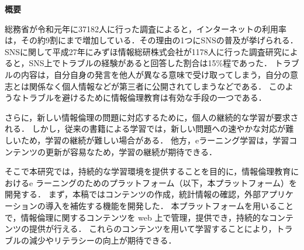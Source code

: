 \begin{center}
{\bf \Large 概要}
\end{center}

総務省が令和元年に37182人に行った調査によると，インターネットの利用率は，その約9割にまで増加している\cite{soumu}．その理由の1つにSNSの普及が挙げられる．
SNSに関して平成27年にみずほ情報総研株式会社が1178人に行った調査研究\cite{mizuho}によると，SNS上でトラブルの経験があると回答した割合は15\%程であった．
トラブルの内容は，自分自身の発言を他人が異なる意味で受け取ってしまう，自分の意志とは関係なく個人情報などが第三者に公開されてしまうなどである．
このようなトラブルを避けるために情報倫理教育は有効な手段の一つである\cite{moraru}．

さらに，新しい情報倫理の問題に対応するために，個人の継続的な学習が要求される\cite{fluency}．
しかし，従来の書籍による学習では，新しい問題への速やかな対応が難しいため，学習の継続が難しい場合がある．
他方，eラーニング学習は，学習コンテンツの更新が容易なため，学習の継続が期待できる\cite{chieru}．

そこで本研究では，持続的な学習環境を提供することを目的に，情報倫理教育におけるe ラーニングのためのプラットフォーム（以下，本プラットフォーム）を開発する．
まず，本稿ではコンテンツの作成，統計情報の確認，外部アプリケーションの導入を補佐する機能を開発した．
本プラットフォームを用いることで，情報倫理に関するコンテンツを web 上で管理，提供でき，持続的なコンテンツの提供が行える．
これらのコンテンツを用いて学習することにより，トラブルの減少やリテラシーの向上が期待できる．

